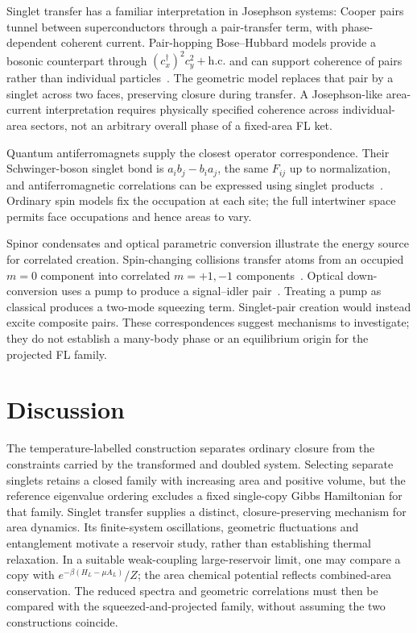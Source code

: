 \documentclass[twocolumn,draft,aps,nofootinbib,nobibnotes,final]{revtex4-2}
\begin{document}
Singlet transfer has a familiar interpretation in Josephson systems: Cooper pairs tunnel between superconductors through a pair-transfer term, with phase-dependent coherent current. Pair-hopping Bose--Hubbard models provide a bosonic counterpart through $(c_x^{\dagger})^2c_y^2+\mathrm{h.c.}$ and can support coherence of pairs rather than individual particles~\cite{Josephson1962Tunnelling,Zhang2013PairHopping}. The geometric model replaces that pair by a singlet across two faces, preserving closure during transfer. A Josephson-like area-current interpretation requires physically specified coherence across individual-area sectors, not an arbitrary overall phase of a fixed-area FL ket.

Quantum antiferromagnets supply the closest operator correspondence. Their Schwinger-boson singlet bond is $a_i b_j-b_i a_j$, the same $F_{ij}$ up to normalization, and antiferromagnetic correlations can be expressed using singlet products~\cite{AuerbachArovas2008Schwinger}. Ordinary spin models fix the occupation at each site; the full intertwiner space permits face occupations and hence areas to vary.

Spinor condensates and optical parametric conversion illustrate the energy source for correlated creation. Spin-changing collisions transfer atoms from an occupied $m=0$ component into correlated $m=+1,-1$ components~\cite{Klempt2010Parametric}. Optical down-conversion uses a pump to produce a signal--idler pair~\cite{Couteau2018DownConversion}. Treating a pump as classical produces a two-mode squeezing term. Singlet-pair creation would instead excite composite pairs. These correspondences suggest mechanisms to investigate; they do not establish a many-body phase or an equilibrium origin for the projected FL family.

\section{Discussion}\label{sec:discussion}

The temperature-labelled construction separates ordinary closure from the constraints carried by the transformed and doubled system. Selecting separate singlets retains a closed family with increasing area and positive volume, but the reference eigenvalue ordering excludes a fixed single-copy Gibbs Hamiltonian for that family. Singlet transfer supplies a distinct, closure-preserving mechanism for area dynamics. Its finite-system oscillations, geometric fluctuations and entanglement motivate a reservoir study, rather than establishing thermal relaxation. In a suitable weak-coupling large-reservoir limit, one may compare a copy with $e^{-\beta(H_L-\mu A_L)}/Z$; the area chemical potential reflects combined-area conservation. The reduced spectra and geometric correlations must then be compared with the squeezed-and-projected family, without assuming the two constructions coincide.
\end{document}
